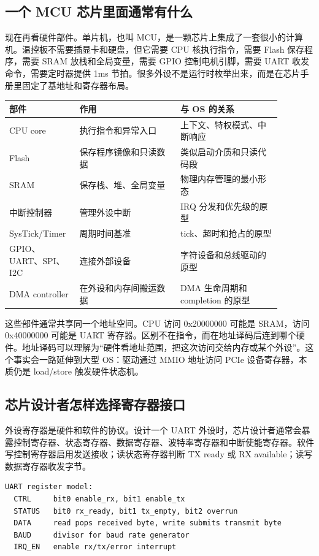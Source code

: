 \subsection{一个 MCU 芯片里面通常有什么}

现在再看硬件部件。单片机，也叫 MCU，是一颗芯片上集成了一套很小的计算机。温控板不需要插显卡和硬盘，但它需要 CPU 核执行指令，需要 Flash 保存程序，需要 SRAM 放栈和全局变量，需要 GPIO 控制电机引脚，需要 UART 收发命令，需要定时器提供 1ms 节拍。很多外设不是运行时枚举出来，而是在芯片手册里固定了基地址和寄存器布局。

\begin{longtable}{p{0.2\linewidth}p{0.34\linewidth}p{0.34\linewidth}}
\toprule
部件 & 作用 & 与 OS 的关系 \\
\midrule
CPU core & 执行指令和异常入口 & 上下文、特权模式、中断响应 \\
Flash & 保存程序镜像和只读数据 & 类似启动介质和只读代码段 \\
SRAM & 保存栈、堆、全局变量 & 物理内存管理的最小形态 \\
中断控制器 & 管理外设中断 & IRQ 分发和优先级的原型 \\
SysTick/Timer & 周期时间基准 & tick、超时和抢占的原型 \\
GPIO、UART、SPI、I2C & 连接外部设备 & 字符设备和总线驱动的原型 \\
DMA controller & 在外设和内存间搬运数据 & DMA 生命周期和 completion 的原型 \\
\bottomrule
\end{longtable}

这些部件通常共享同一个地址空间。CPU 访问 0x20000000 可能是 SRAM，访问 0x40000000 可能是 UART 寄存器。区别不在指令，而在地址译码后连到哪个硬件。地址译码可以理解为“硬件看地址范围，把这次访问交给内存或某个外设”。这个事实会一路延伸到大型 OS：驱动通过 MMIO 地址访问 PCIe 设备寄存器，本质仍是 load/store 触发硬件状态机。

\subsection{芯片设计者怎样选择寄存器接口}

外设寄存器是硬件和软件的协议。设计一个 UART 外设时，芯片设计者通常会暴露控制寄存器、状态寄存器、数据寄存器、波特率寄存器和中断使能寄存器。软件写控制寄存器启用发送接收；读状态寄存器判断 TX ready 或 RX available；读写数据寄存器收发字节。

\begin{lstlisting}
UART register model:
  CTRL     bit0 enable_rx, bit1 enable_tx
  STATUS   bit0 rx_ready, bit1 tx_empty, bit2 overrun
  DATA     read pops received byte, write submits transmit byte
  BAUD     divisor for baud rate generator
  IRQ_EN   enable rx/tx/error interrupt
\end{lstlisting}


